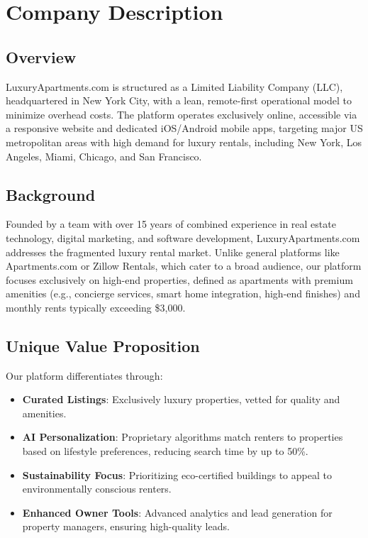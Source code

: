 \documentclass[12pt]{article}
\begin{document}
\section{Company Description}
\subsection{Overview}
LuxuryApartments.com is structured as a Limited Liability Company (LLC), headquartered in New York City, with a lean, remote-first operational model to minimize overhead costs. The platform operates exclusively online, accessible via a responsive website and dedicated iOS/Android mobile apps, targeting major US metropolitan areas with high demand for luxury rentals, including New York, Los Angeles, Miami, Chicago, and San Francisco.

\subsection{Background}
Founded by a team with over 15 years of combined experience in real estate technology, digital marketing, and software development, LuxuryApartments.com addresses the fragmented luxury rental market. Unlike general platforms like Apartments.com or Zillow Rentals, which cater to a broad audience, our platform focuses exclusively on high-end properties, defined as apartments with premium amenities (e.g., concierge services, smart home integration, high-end finishes) and monthly rents typically exceeding \$3,000.

\subsection{Unique Value Proposition}
Our platform differentiates through:
\begin{itemize}
    \item \textbf{Curated Listings}: Exclusively luxury properties, vetted for quality and amenities.
    \item \textbf{AI Personalization}: Proprietary algorithms match renters to properties based on lifestyle preferences, reducing search time by up to 50\%.
    \item \textbf{Sustainability Focus}: Prioritizing eco-certified buildings to appeal to environmentally conscious renters.
    \item \textbf{Enhanced Owner Tools}: Advanced analytics and lead generation for property managers, ensuring high-quality leads.
\end{itemize}
\end{document}
